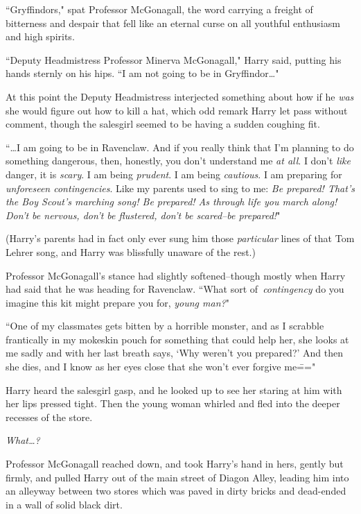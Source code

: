 ``Gryffindors," spat Professor McGonagall, the word carrying a freight of bitterness and despair that fell like an eternal curse on all youthful enthusiasm and high spirits.

``Deputy Headmistress Professor Minerva McGonagall," Harry said, putting his hands sternly on his hips. ``I am not going to be in Gryffindor{\ldots}"

At this point the Deputy Headmistress interjected something about how if he \emph{was} she would figure out how to kill a hat, which odd remark Harry let pass without comment, though the salesgirl seemed to be having a sudden coughing fit.

``{\ldots}I am going to be in Ravenclaw. And if you really think that I'm planning to do something dangerous, then, honestly, you don't understand me \emph{at all}. I don't \emph{like} danger, it is \emph{scary}. I am being \emph{prudent}. I am being \emph{cautious}. I am preparing for \emph{unforeseen contingencies}. Like my parents used to sing to me: \emph{Be prepared! That's the Boy Scout's marching song! Be prepared! As through life you march along! Don't be nervous, don't be flustered, don't be scared\---be prepared!}"

(Harry's parents had in fact only ever sung him those \emph{particular} lines of that Tom Lehrer song, and Harry was blissfully unaware of the rest.)

Professor McGonagall's stance had slightly softened\---though mostly when Harry had said that he was heading for Ravenclaw. ``What sort of\linebreak\ \emph{contingency} do you imagine this kit might prepare you for, \emph{young man?}"

``One of my classmates gets bitten by a horrible monster, and as I scrabble frantically in my mokeskin pouch for something that could help her, she looks at me sadly and with her last breath says, `Why weren't you prepared?' And then she dies, and I know as her eyes close that she won't ever forgive me\==="

Harry heard the salesgirl gasp, and he looked up to see her staring at him with her lips pressed tight. Then the young woman whirled and fled into the deeper recesses of the store.

\emph{What{\ldots}?}

Professor McGonagall reached down, and took Harry's hand in hers, gently but firmly, and pulled Harry out of the main street of Diagon Alley, leading him into an alleyway between two stores which was paved in dirty bricks and dead-ended in a wall of solid black dirt.


